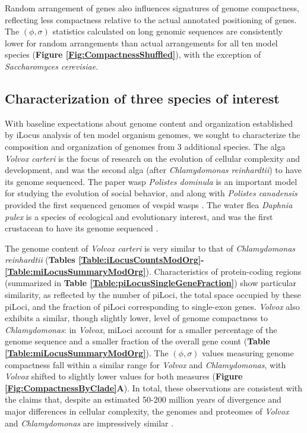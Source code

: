 Random arrangement of genes also influences signatures of genome compactness, reflecting less compactness relative to the actual annotated positioning of genes.
The $(\phi, \sigma)$ statistics calculated on long genomic sequences are consistently lower for random arrangements than actual arrangements for all ten model species (\textbf{Figure \ref{Fig:CompactnessShuffled}}), with the exception of \textit{Saccharomyces cerevisiae}.

\subsection*{Characterization of three species of interest}

With baseline expectations about genome content and organization established by iLocus analysis of ten model organism genomes, we sought to characterize the composition and organization of genomes from 3 additional species.
The alga \textit{Volvox carteri} is the focus of research on the evolution of cellular complexity and development, and was the second alga (after \textit{Chlamydomonas reinhardtii}) to have its genome sequenced.
The paper wasp \textit{Polistes dominula} is an important model for studying the evolution of social behavior, and along with \textit{Polistes canadensis} provided the first sequenced genomes of vespid wasps \cite{PdomGenome}.
The water flea \textit{Daphnia pulex} is a species of ecological and evolutionary interest, and was the first crustacean to have its genome sequenced \cite{DaphniaGenome}.

The genome content of \textit{Volvox carteri} is very similar to that of \textit{Chlamydomonas reinhardtii} (\textbf{Tables \ref{Table:iLocusCountsModOrg}-\ref{Table:miLocusSummaryModOrg}}).
Characteristics of protein-coding regions (summarized in \textbf{Table \ref{Table:piLocusSingleGeneFraction}}) show particular similarity, as reflected by the number of piLoci, the total space occupied by these piLoci, and the fraction of piLoci corresponding to single-exon genes.
\textit{Volvox} also exhibits a similar, though slightly lower, level of genome compactness to \textit{Chlamydomonas}:
in \textit{Volvox}, miLoci account for a smaller percentage of the genome sequence and a smaller fraction of the overall gene count (\textbf{Table \ref{Table:miLocusSummaryModOrg}}).
The $(\phi, \sigma)$ values measuring genome compactness fall within a similar range for \textit{Volvox} and \textit{Chlamydomonas}, with \textit{Volvox} shifted to slightly lower values for both measures (\textbf{Figure \ref{Fig:CompactnessByClade}A}).
In total, these observations are consistent with the claims that, despite an estimated 50-200 million years of divergence and major differences in cellular complexity, the genomes and proteomes of \textit{Volvox} and \textit{Chlamydomonas} are impressively similar \cite{VolvoxGenome}.

